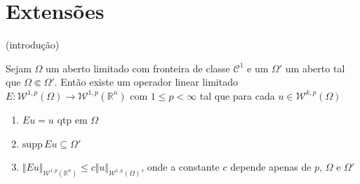 \documentclass[a4paper, 11pt]{book}
\theoremstyle{definition}
\newcommand{\bR}{\mathbb{R}}
\newcommand{\cC}{\mathcal{C}}
\newcommand{\cW}{\mathcal{W}}
\newcommand{\supp}{\mathrm{supp}\,}
\begin{document}
\section{Extensões}

(introdução)

\begin{tbox} \label{thm:extensao}
    Sejam $\Omega$ um aberto limitado com fronteira de classe $\cC^1$ e um $\Omega'$ um aberto tal que $\Omega \Subset \Omega'$. Então existe um operador linear limitado $E : \cW^{1,p}(\Omega) \to \cW^{1,p}(\bR ^n)$ com $1 \leqslant p < \infty$ tal que para cada $u \in \cW^{k,p}(\Omega)$
    \begin{enumerate}[leftmargin=*, label=\textbf{(\alph*)}]
        \item $Eu = u$ qtp em $\Omega$
        \item $\supp Eu \subseteq \Omega'$
        \item $\Vert Eu \Vert_{\cW^{1,p}(\bR^n)} \leqslant c \Vert u \Vert_{\cW^{1,p}(\Omega)}$, onde a constante $c$ depende apenas de $p$, $\Omega$ e $\Omega'$
    \end{enumerate}
\end{tbox}
\end{document}
